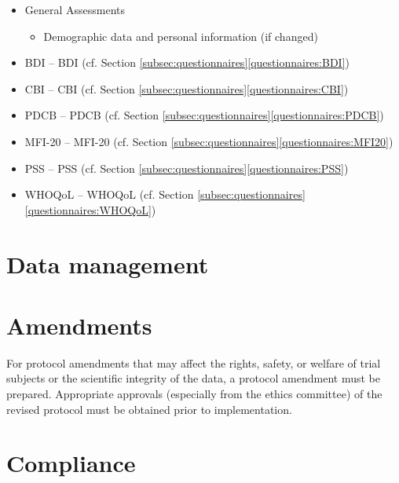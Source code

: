 \begin{itemize}[noitemsep,topsep=0pt]
\item General Assessments
\begin{itemize}[noitemsep,topsep=0pt]
\item Demographic data and personal information (if changed)
\end{itemize}
\item \acl{BDI} -- \acs{BDI} (cf. Section \ref{subsec:questionnaires}\ref{questionnaires:BDI})
\item \acl{CBI} -- \acs{CBI} (cf. Section \ref{subsec:questionnaires}\ref{questionnaires:CBI})
\item \acl{PDCB} -- \acs{PDCB} (cf. Section \ref{subsec:questionnaires}\ref{questionnaires:PDCB})
\item \acl{MFI-20} -- \acs{MFI-20} (cf. Section \ref{subsec:questionnaires}\ref{questionnaires:MFI20})
\item \acl{PSS} -- \acs{PSS} (cf. Section \ref{subsec:questionnaires}\ref{questionnaires:PSS})
\item \acl{WHOQoL} -- \acs{WHOQoL} (cf. Section \ref{subsec:questionnaires}\ref{questionnaires:WHOQoL})
\end{itemize}

\section{Data management}

\section{Amendments}
For protocol amendments that may affect the rights, safety, or welfare of trial subjects or the scientific integrity of the data, a protocol amendment must be prepared. Appropriate approvals (especially from the ethics committee) of the revised protocol must be obtained prior to implementation.

\section{Compliance}
